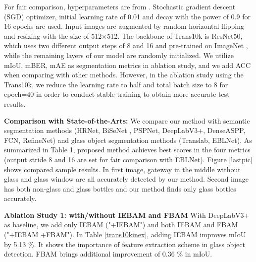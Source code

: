 \documentclass[10pt,twocolumn,letterpaper]{article}
\begin{document}
For fair comparison, hyperparameters are from \cite{he2021enhanced}. Stochastic gradient descent (SGD) optimizer, initial learning rate of 0.01 and decay \cite{liu2015parsenet} with the power of 0.9 for 16 epochs are used. Input images are augmented by random horizontal flipping and resizing with the size of 512$\times{}$512. The backbone of Trans10k is ResNet50, which uses two different output steps of 8 and 16 and pre-trained on ImageNet \cite{deng2009imagenet}, while the remaining layers of our model are randomly initialized. We utilize mIoU, mBER, mAE as segmentation metrics in ablation study, and we add ACC when comparing with other methods. 
However, in the ablation study using the Trans10k, we reduce the learning rate to half and total batch size to 8 for epoch=40 in order to conduct stable training to obtain more accurate test results.

\textbf{Comparison with State-of-the-Arts:} We compare our method with semantic segmentation methods (HRNet\cite{wang2020deep}, BiSeNet \cite{yu2018bisenet}, PSPNet\cite{gao2020highly}, DeepLabV3+\cite{chen2018reverse}, DenseASPP\cite{deng2018learning}, FCN\cite{long2015fully}, RefineNet\cite{lin2019refinenet}) and glass object segmentation methods (Translab\cite{xie2020segmenting}, EBLNet\cite{he2021enhanced}). As summarized in Table 1, proposed method achieves best scores in the four metrics (output stride 8 and 16 are set for fair comparison with EBLNet). Figure \ref{lastpic} shows compared sample results. In first image, gateway in the middle without glass and glass window are all accurately detected by our method. Second image has both non-glass and glass bottles and our method finds only glass bottles accurately.

\textbf{Ablation Study 1: with/without IEBAM and FBAM} With DeepLabV3+\cite{chen2018reverse} as baseline, we add only IEBAM ("+IEBAM") and both IEBAM and FBAM ("+IEBAM +FBAM").
In Table \ref{trans10kinex}, adding IEBAM improves mIoU by 5.13 $\%$. It shows the importance of feature extraction scheme in glass object detection. FBAM brings additional improvement of 0.36 $\%$ in mIoU. 
\end{document}
